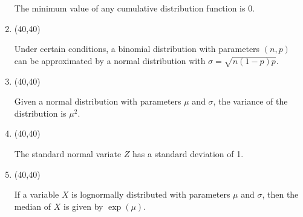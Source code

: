\documentclass[12pt,twoside]{article}
\newcommand{\?}{\stackrel{?}{=}}
\newcommand{\gr}{\color{green!40!black}}
\begin{document}
\begin{enumerate}[\bf (i)]
\begin{minipage}{.1\linewidth}
    \end{minipage}\quad
    \begin{minipage}{.85\linewidth}
      The minimum value of any cumulative distribution function is $0$.
     \end{minipage}  
  \smallskip  
\item \hfill
  \begin{minipage}{.1\linewidth}
    \framebox(40,40){\gr } %
  \end{minipage}\quad
  \begin{minipage}{.85\linewidth}
    Under certain conditions, a binomial distribution with parameters $(n,p)$ can be approximated by a normal
    distribution with $\sigma = \sqrt{n(1-p)p}$.
  \end{minipage}  
  \smallskip

  \item \hfill
  \begin{minipage}{.1\linewidth}
    \framebox(40,40){\gr  } %
  \end{minipage}\quad
  \begin{minipage}{.85\linewidth}
    Given a normal distribution with parameters $\mu$ and $\sigma$, the variance of the distribution is $\mu^{2}$.
  \end{minipage}
  \smallskip   
  \item \hfill
    \begin{minipage}{.1\linewidth}
      \framebox(40,40){\gr } %
    \end{minipage}\quad
    \begin{minipage}{.85\linewidth}
      The standard normal variate $Z$ has a standard deviation of 1.
    \end{minipage}
  \smallskip

    \item \hfill
    \begin{minipage}{.1\linewidth}
      \framebox(40,40){\gr } %
    \end{minipage}\quad
    \begin{minipage}{.85\linewidth}
      If a variable $X$ is lognormally distributed with parameters $\mu$ and $\sigma$, then the median of $X$ is given by $\exp(\mu)$.
    \end{minipage}

    
  \end{enumerate}
  \eject
\end{document}
